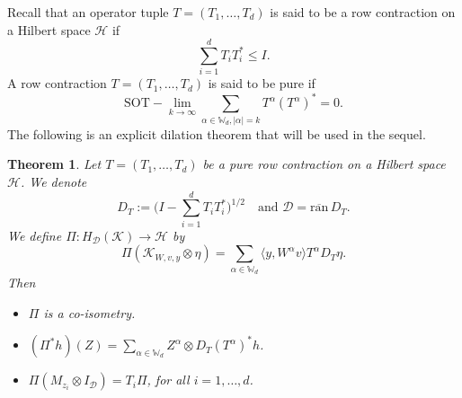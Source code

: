 \documentclass[12pt]{amsart}%
\newtheorem{theorem}{Theorem}[section]
\numberwithin{equation}{section}
\newcommand{\bW}{\mathbb{W}}
\newcommand{\cld}{\mathcal{D}}
\newcommand{\clh}{\mathcal{H}}
\newcommand{\clk}{\mathcal{K}}
\newcommand\la{{\langle }}
\newcommand\ra{{\rangle}}
\begin{document}
Recall that an operator tuple $T=(T_1,\ldots,T_d)$ is said to be a row contraction on a Hilbert space $\clh$ if 
\[
\sum_{i=1}^d T_iT_i^*\leq I.
\]
A row contraction $T=(T_1,\ldots,T_d)$ is said to be pure if 
\[
\text{SOT}-\lim_{k\to\infty}\sum_{\alpha\in\bW_d,|\alpha|=k}T^{\alpha}(T^{\alpha})^*=0.
\]
The following is an explicit dilation theorem that will be used in the sequel.
\begin{theorem}\label{dilation}
Let $T=(T_1,\ldots,T_d)$ be a pure row contraction on a Hilbert space $\clh$. We denote
\[
D_T:=\Big( I-\sum_{i=1}^d T_iT_i^*\Big)^{1/2}\quad \text{and}\,\,\cld=\overline{\text{ran}}\,D_T.
\]
We define $\Pi:H_{\cld}(\clk)\to\clh$  by
\begin{equation}\label{Pi}
\Pi(\clk_{W,v,y}\otimes\eta)=\sum_{\alpha\in \bW_d}\la y,W^\alpha v\ra T^\alpha D_T\eta.
\end{equation}
Then 
\begin{itemize}
\item[(i)] $\Pi$ is a co-isometry.
\item[(ii)] $(\Pi^*h)(Z)=\sum_{\alpha\in\bW_d}Z^{\alpha}\otimes D_T(T^{\alpha})^*h$.
\item[(iii)] $\Pi(M_{z_i}\otimes I_{\cld})=T_i\Pi$, for all $i=1,\ldots,d$.
\end{itemize}
\end{theorem}
\end{document}

